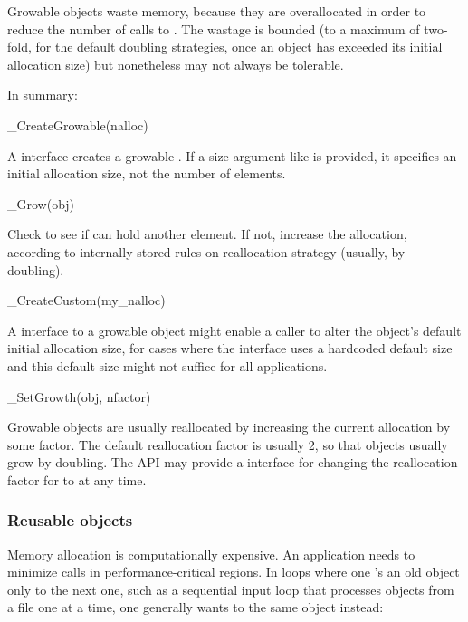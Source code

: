 Growable objects waste memory, because they are overallocated in order
to reduce the number of calls to .  The wastage is
bounded (to a maximum of two-fold, for the default doubling
strategies, once an object has exceeded its initial allocation size)
but nonetheless may not always be tolerable. 

In summary: 

\begin{sreapi}
\hypertarget{ifc:CreateGrowable}
{\item[\_CreateGrowable(nalloc)]}

A  interface creates a growable
. If a size argument like  is provided, it
specifies an initial allocation size, not the number of elements.

\hypertarget{ifc:Grow}
{\item[\_Grow(obj)]}

Check to see if  can hold another element. If not, increase
the allocation, according to internally stored rules on reallocation
strategy (usually, by doubling).

\hypertarget{ifc:CreateCustom}
{\item[\_CreateCustom(my\_nalloc)]}

A  interface to a growable object might enable
a caller to alter the object's default initial allocation size, for
cases where the  interface uses a hardcoded default
size and this default size might not suffice for all applications.

\hypertarget{ifc:SetGrowth}
{\item[\_SetGrowth(obj, nfactor)]}

Growable objects are usually reallocated by increasing the current
allocation by some factor. The default reallocation factor is usually
2, so that objects usually grow by doubling. The API may provide a
 interface for changing the reallocation factor
for  to  at any time.
\end{sreapi}


  \subsubsection{Reusable objects}

Memory allocation is computationally expensive. An application needs
to minimize  calls in performance-critical
regions. In loops where one 's an old object only
to  the next one, such as a sequential input loop
that processes objects from a file one at a time, one generally wants
to  the same object instead:

